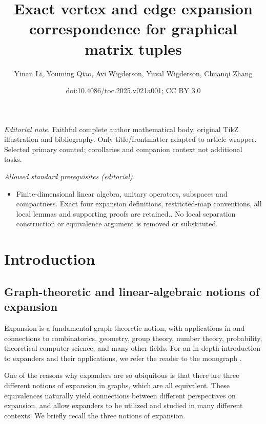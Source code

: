 \documentclass[11pt]{article}
\title{Exact vertex and edge expansion correspondence for graphical matrix tuples}
\author{Yinan Li, Youming Qiao, Avi Wigderson, Yuval Wigderson, Chuanqi Zhang}
\date{doi:10.4086/toc.2025.v021a001; CC BY 3.0}
\theoremstyle{plain}
\numberwithin{equation}{section}
\theoremstyle{definition}
\begin{document}
\maketitle
\noindent\textit{Editorial note.} Faithful complete author mathematical body, original TikZ illustration and bibliography. Only title/frontmatter adapted to article wrapper. Selected primary counted; corollaries and companion context not additional tasks.\par\medskip
\noindent\textit{Allowed standard prerequisites (editorial).}\begin{itemize}
\item Finite-dimensional linear algebra, unitary operators, subspaces and compactness. Exact four expansion definitions, restricted-map conventions, all local lemmas and supporting proofs are retained.. No local separation construction or equivalence argument is removed or substituted.
\end{itemize}\medskip
\section{Introduction}
\subsection{Graph-theoretic and linear-algebraic notions of expansion}\label{subsec:overview}

Expansion is a fundamental graph-theoretic notion, with applications in and connections to combinatorics, geometry, group theory, number theory, probability, theoretical computer science, and many other fields. For an in-depth introduction to expanders and their applications, we refer the reader to the monograph \cite{HLW06}.

One of the reasons why expanders are so ubiquitous is that there are three different notions of expansion in graphs, which are all equivalent. These equivalences naturally yield connections between different perspectives on expansion, and allow expanders to be utilized and studied in many different contexts. We briefly recall the three notions of expansion.
\end{document}
